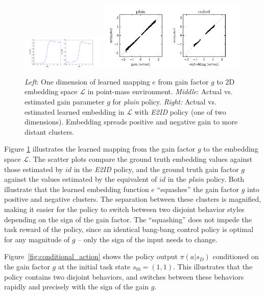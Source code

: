 \documentclass{article}
\newcommand{\cL}{\mathcal{L}}
\newcommand{\plain}{\emph{plain}}
\newcommand{\embed}{\emph{E2ID}}
\newcommand{\embedfn}{e}
\newcommand{\idfn}{id}
\newcommand{\latent}{\cL}
\newcommand{\figref}[1]{Figure \ref{#1}}
\begin{document}
\begin{figure}
\centering
\includegraphics[trim={13.7cm 0 2cm 0}, clip, width=0.35\textwidth]{pointmass_embed_mapping.pdf}
\includegraphics[trim={0.5cm 0 1cm 0}, clip, width=0.63\textwidth]{pointmass_embed_scatter.pdf}
\caption{
\emph{Left}: One dimension of learned mapping $\embedfn$ from gain factor $g$ to 2D embedding space $\latent$ in point-mass environment.
\emph{Middle}: Actual vs. estimated gain parameter $g$ for \plain{} policy.
\emph{Right:} Actual vs. estimated learned embedding in $\latent$ with \embed{} policy (one of two dimensions).
Embedding spreads positive and negative gain to more distant clusters.
}
\label{embed-mapping}
\end{figure}


\figref{embed-mapping} illustrates the learned mapping from the gain factor $g$
to the embedding space $\latent$.
The scatter plots compare the ground truth embedding values
against those estimated by $\idfn$ in the \embed{} policy,
and the ground truth gain factor $g$ against the values estimated by the equivalent of $\idfn$ in the \plain{} policy.
Both illustrate that the learned embedding function $\embedfn$ ``squashes'' the gain factor $g$ into positive and negative clusters.
The separation between these clusters is magnified, making it easier for the policy to switch between two disjoint behavior styles depending on the sign of the gain factor.
The ``squashing'' does not impede the task reward of the policy,
since an identical bang-bang control policy is optimal for any magnitude of $g$ -- only the sign of the input needs to change.

Figure~\ref{fig:conditional_action} shows the policy output $\pi(a|s_D)$ conditioned on
the gain factor $g$ at the initial task state $s_{t0} = (1, 1)$.
This illustrates that the policy contains two disjoint behaviors,
and switches between these behaviors rapidly and precisely with the sign of the gain $g$.
\end{document}
